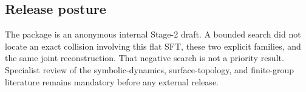 \subsection{Release posture}

The package is an anonymous internal Stage-2 draft.  A bounded search did not
locate an exact collision involving this flat SFT, these two explicit families,
and the same joint reconstruction.  That negative search is not a priority
result.  Specialist review of the symbolic-dynamics, surface-topology, and
finite-group literature remains mandatory before any external release.
